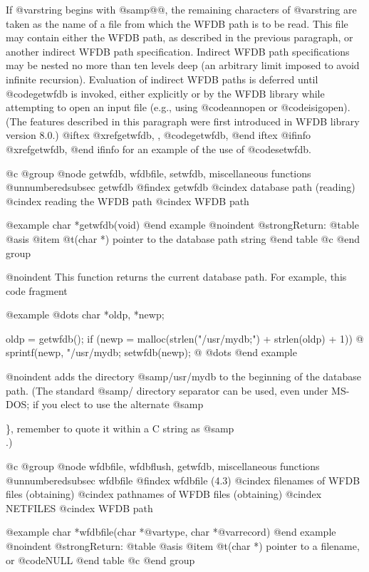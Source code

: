 {{{{{{{{{If @var{string} begins with @samp{@@}, the remaining characters of
@var{string} are taken as the name of a file from which the WFDB path is
to be read.  This file may contain either the WFDB path, as described in
the previous paragraph, or another indirect WFDB path specification.
Indirect WFDB path specifications may be nested no more than ten levels
deep (an arbitrary limit imposed to avoid infinite recursion).
Evaluation of indirect WFDB paths is deferred until @code{getwfdb} is
invoked, either explicitly or by the WFDB library while attempting to open
an input file (e.g., using @code{annopen} or @code{isigopen}).  (The
features described in this paragraph were first introduced in WFDB library
version 8.0.)
@iftex
@xref{getwfdb, , @code{getwfdb}},
@end iftex
@ifinfo
@xref{getwfdb},
@end ifinfo
for an example of the use of @code{setwfdb}.

@c @group
@node     getwfdb, wfdbfile, setwfdb, miscellaneous functions
@unnumberedsubsec getwfdb
@findex getwfdb
@cindex database path (reading)
@cindex reading the WFDB path
@cindex WFDB path

@example
char *getwfdb(void)
@end example
@noindent
@strong{Return:}
@table @asis
@item @t{(char *)}
pointer to the database path string
@end table
@c @end group

@noindent
This function returns the current database path.  For example, this code
fragment

@example
@dots{}
char *oldp, *newp;

oldp = getwfdb();
if (newp = malloc(strlen("/usr/mydb;") + strlen(oldp) + 1)) @{
    sprintf(newp, "/usr/mydb;%
    setwfdb(newp);
@}
@dots{}
@end example

@noindent
adds the directory @samp{/usr/mydb} to the beginning of the database path.
(The standard @samp{/} directory separator can be used, even under MS-DOS; if
you elect to use the alternate @samp{\}, remember to quote it within a C string
as @samp{\\}.)

@c @group
@node     wfdbfile, wfdbflush, getwfdb, miscellaneous functions
@unnumberedsubsec wfdbfile
@findex wfdbfile (4.3)
@cindex filenames of WFDB files (obtaining)
@cindex pathnames of WFDB files (obtaining)
@cindex NETFILES
@cindex WFDB path

@example
char *wfdbfile(char *@var{type}, char *@var{record})
@end example
@noindent
@strong{Return:}
@table @asis
@item @t{(char *)}
pointer to a filename, or @code{NULL}
@end table
@c @end group

}}}}}}}}}}

